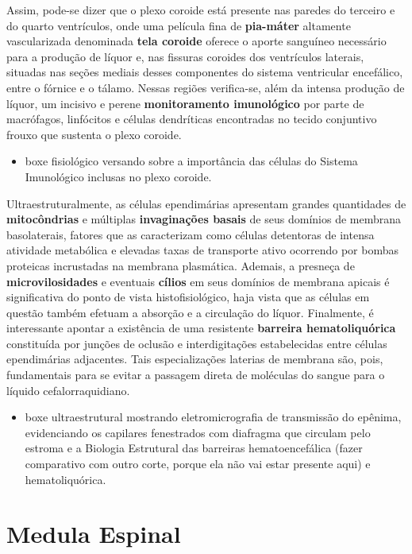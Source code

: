 \documentclass[
]{book}
\providecommand{\tightlist}{%
  \setlength{\itemsep}{0pt}\setlength{\parskip}{0pt}}
\theoremstyle{definition}
\theoremstyle{definition}
\theoremstyle{definition}
\theoremstyle{definition}
\theoremstyle{remark}
\begin{document}
Assim, pode-se dizer que o plexo coroide está presente nas paredes do terceiro e do quarto ventrículos, onde uma película fina de \textbf{pia-máter} altamente vascularizada denominada \textbf{tela coroide} oferece o aporte sanguíneo necessário para a produção de líquor e, nas fissuras coroides dos ventrículos laterais, situadas nas seções mediais desses componentes do sistema ventricular encefálico, entre o fórnice e o tálamo. Nessas regiões verifica-se, além da intensa produção de líquor, um incisivo e perene \textbf{monitoramento imunológico} por parte de macrófagos, linfócitos e células dendríticas encontradas no tecido conjuntivo frouxo que sustenta o plexo coroide.

\begin{itemize}
\tightlist
\item
  boxe fisiológico versando sobre a importância das células do Sistema Imunológico inclusas no plexo coroide.
\end{itemize}

Ultraestruturalmente, as células ependimárias apresentam grandes quantidades de \textbf{mitocôndrias} e múltiplas \textbf{invaginações basais} de seus domínios de membrana basolaterais, fatores que as caracterizam como células detentoras de intensa atividade metabólica e elevadas taxas de transporte ativo ocorrendo por bombas proteicas incrustadas na membrana plasmática. Ademais, a presneça de \textbf{microvilosidades} e eventuais \textbf{cílios} em seus domínios de membrana apicais é significativa do ponto de vista histofisiológico, haja vista que as células em questão também efetuam a absorção e a circulação do líquor. Finalmente, é interessante apontar a existência de uma resistente \textbf{barreira hematoliquórica} constituída por junções de oclusão e interdigitações estabelecidas entre células ependimárias adjacentes. Tais especializações laterias de membrana são, pois, fundamentais para se evitar a passagem direta de moléculas do sangue para o líquido cefalorraquidiano.

\begin{itemize}
\tightlist
\item
  boxe ultraestrutural mostrando eletromicrografia de transmissão do epênima, evidenciando os capilares fenestrados com diafragma que circulam pelo estroma e a Biologia Estrutural das barreiras hematoencefálica (fazer comparativo com outro corte, porque ela não vai estar presente aqui) e hematoliquórica.
\end{itemize}

\hypertarget{medula-espinal}{%
\chapter{Medula Espinal}\label{medula-espinal}}
\end{document}

